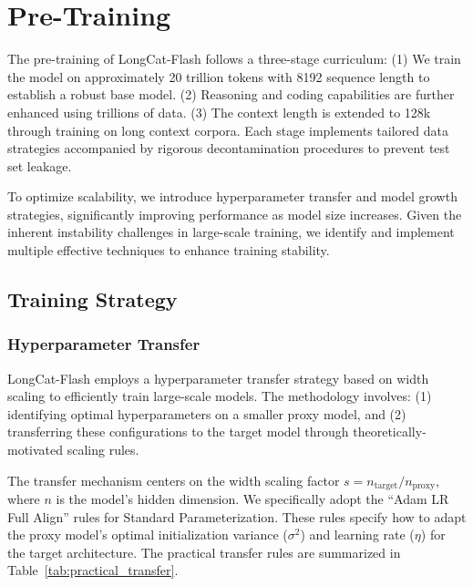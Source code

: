 \documentclass{article}
\newcommand{\longcat}{LongCat-Flash\xspace}
\begin{document}
\section{Pre-Training}


The pre-training of \longcat follows a three-stage curriculum: (1) We train the model on approximately 20 trillion tokens with 8192 sequence length to establish a robust base model. (2) Reasoning and coding capabilities are further enhanced using trillions of data. (3) The context length is extended to 128k through training on long context corpora. Each stage implements tailored data strategies accompanied by rigorous decontamination procedures to prevent test set leakage.

To optimize scalability, we introduce hyperparameter transfer and model growth strategies, significantly improving performance as model size increases. Given the inherent instability challenges in large-scale training, we identify and implement multiple effective techniques to enhance training stability.


\subsection{Training Strategy}

\subsubsection{Hyperparameter Transfer}
\longcat employs a hyperparameter transfer strategy based on width scaling \citep{everett2024scaling} to efficiently train large-scale models. The methodology involves: (1) identifying optimal hyperparameters on a smaller proxy model, and (2) transferring these configurations to the target model through theoretically-motivated scaling rules.

The transfer mechanism centers on the width scaling factor $s = n_{\text{target}} / n_{\text{proxy}}$, where $n$ is the model's hidden dimension. We specifically adopt the ``Adam LR Full Align'' rules for Standard Parameterization. These rules specify how to adapt the proxy model's optimal initialization variance ($\sigma^2$) and learning rate ($\eta$) for the target architecture. The practical transfer rules are summarized in Table~\ref{tab:practical_transfer}. 
\end{document}
